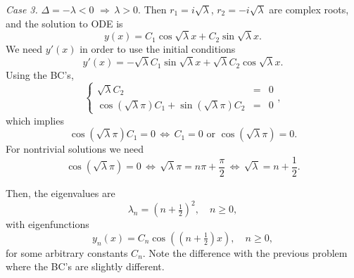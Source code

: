 \documentclass[11pt]{article}
\begin{document}
\begin{solution}
\par \textsl{Case 3.} $\Delta = -\lambda <0 \,\, \Rightarrow \, \lambda>0.$ Then $r_{1}=i\sqrt{\lambda}$, $r_{2}=-i\sqrt{\lambda}$ are complex roots, and the solution to ODE is
\[y(x)=C_{1}\cos\sqrt{\lambda}x+C_{2}\sin\sqrt{\lambda}x.\]
We need $y'(x)$ in order to use the initial conditions
\[y'(x)=-\sqrt{\lambda}C_{1}\sin\sqrt{\lambda}x+\sqrt{\lambda}C_{2}\cos\sqrt{\lambda}x.\]
Using the BC's,
\begin{equation*}
\left\{\begin{array}{rcl}
       \sqrt{\lambda}C_{2}  & = & 0\\
       \cos(\sqrt{\lambda}\pi)C_{1} + \sin(\sqrt{\lambda}\pi)C_{2}&=&0
      \end{array}\right. ,
\end{equation*}
which implies 
\[\cos(\sqrt{\lambda}\pi)C_{1}=0 \,\Leftrightarrow\, C_{1} = 0 \text{ or } \cos(\sqrt{\lambda}\pi)=0.\]
For nontrivial solutions we need 
\[\cos(\sqrt{\lambda}\pi)=0 \,\Leftrightarrow \, \sqrt{\lambda}\pi=n\pi+\frac{\pi}{2}\,\Leftrightarrow \, \sqrt{\lambda}=n+\frac{1}{2}.\] 

Then, the eigenvalues are
\[\boxed{\lambda_{n}=(n+\tfrac{1}{2})^{2}}, \quad n\geq 0,\]
with eigenfunctions
\[\boxed{y_{n}(x)=C_{n}\cos((n+\tfrac{1}{2})x)}, \quad n\geq 0,\]
for some arbitrary constants $C_{n}$.
Note the difference with the previous problem where the BC's are slightly different.
\end{solution}
\end{document}
